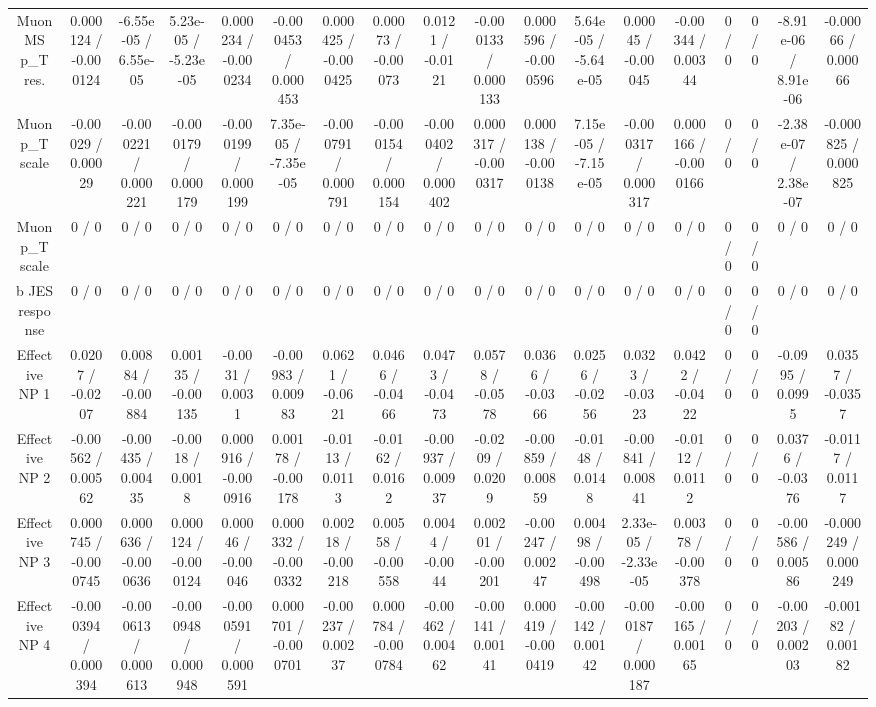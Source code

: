 \documentclass[10pt]{article}
\begin{document}
\begin{table}[htbp]
\begin{center}
\begin{tabular}{|c|c|c|c|c|c|c|c|c|c|c|c|c|c|c|c|c|c|}
  Muon MS p_{T} res. & 0.000124 / -0.000124 & -6.55e-05 / 6.55e-05 & 5.23e-05 / -5.23e-05 & 0.000234 / -0.000234 & -0.000453 / 0.000453 & 0.000425 / -0.000425 & 0.00073 / -0.00073 & 0.0121 / -0.0121 & -0.000133 / 0.000133 & 0.000596 / -0.000596 & 5.64e-05 / -5.64e-05 & 0.00045 / -0.00045 & -0.00344 / 0.00344 & 0 / 0 & 0 / 0 & -8.91e-06 / 8.91e-06 & -0.00066 / 0.00066 \\ 
  Muon p_{T} scale & -0.00029 / 0.00029 & -0.000221 / 0.000221 & -0.000179 / 0.000179 & -0.000199 / 0.000199 & 7.35e-05 / -7.35e-05 & -0.000791 / 0.000791 & -0.000154 / 0.000154 & -0.000402 / 0.000402 & 0.000317 / -0.000317 & 0.000138 / -0.000138 & 7.15e-05 / -7.15e-05 & -0.000317 / 0.000317 & 0.000166 / -0.000166 & 0 / 0 & 0 / 0 & -2.38e-07 / 2.38e-07 & -0.000825 / 0.000825 \\ 
  Muon p_{T} scale & 0 / 0 & 0 / 0 & 0 / 0 & 0 / 0 & 0 / 0 & 0 / 0 & 0 / 0 & 0 / 0 & 0 / 0 & 0 / 0 & 0 / 0 & 0 / 0 & 0 / 0 & 0 / 0 & 0 / 0 & 0 / 0 & 0 / 0 \\ 
  b JES response & 0 / 0 & 0 / 0 & 0 / 0 & 0 / 0 & 0 / 0 & 0 / 0 & 0 / 0 & 0 / 0 & 0 / 0 & 0 / 0 & 0 / 0 & 0 / 0 & 0 / 0 & 0 / 0 & 0 / 0 & 0 / 0 & 0 / 0 \\ 
  Effective NP 1 & 0.0207 / -0.0207 & 0.00884 / -0.00884 & 0.00135 / -0.00135 & -0.0031 / 0.0031 & -0.00983 / 0.00983 & 0.0621 / -0.0621 & 0.0466 / -0.0466 & 0.0473 / -0.0473 & 0.0578 / -0.0578 & 0.0366 / -0.0366 & 0.0256 / -0.0256 & 0.0323 / -0.0323 & 0.0422 / -0.0422 & 0 / 0 & 0 / 0 & -0.0995 / 0.0995 & 0.0357 / -0.0357 \\ 
  Effective NP 2 & -0.00562 / 0.00562 & -0.00435 / 0.00435 & -0.0018 / 0.0018 & 0.000916 / -0.000916 & 0.00178 / -0.00178 & -0.0113 / 0.0113 & -0.0162 / 0.0162 & -0.00937 / 0.00937 & -0.0209 / 0.0209 & -0.00859 / 0.00859 & -0.0148 / 0.0148 & -0.00841 / 0.00841 & -0.0112 / 0.0112 & 0 / 0 & 0 / 0 & 0.0376 / -0.0376 & -0.0117 / 0.0117 \\ 
  Effective NP 3 & 0.000745 / -0.000745 & 0.000636 / -0.000636 & 0.000124 / -0.000124 & 0.00046 / -0.00046 & 0.000332 / -0.000332 & 0.00218 / -0.00218 & 0.00558 / -0.00558 & 0.0044 / -0.0044 & 0.00201 / -0.00201 & -0.00247 / 0.00247 & 0.00498 / -0.00498 & 2.33e-05 / -2.33e-05 & 0.00378 / -0.00378 & 0 / 0 & 0 / 0 & -0.00586 / 0.00586 & -0.000249 / 0.000249 \\ 
  Effective NP 4 & -0.000394 / 0.000394 & -0.000613 / 0.000613 & -0.000948 / 0.000948 & -0.000591 / 0.000591 & 0.000701 / -0.000701 & -0.00237 / 0.00237 & 0.000784 / -0.000784 & -0.00462 / 0.00462 & -0.00141 / 0.00141 & 0.000419 / -0.000419 & -0.00142 / 0.00142 & -0.000187 / 0.000187 & -0.00165 / 0.00165 & 0 / 0 & 0 / 0 & -0.00203 / 0.00203 & -0.00182 / 0.00182 \\ 

\end{tabular}
\end{center}
\end{table}
\end{document}
